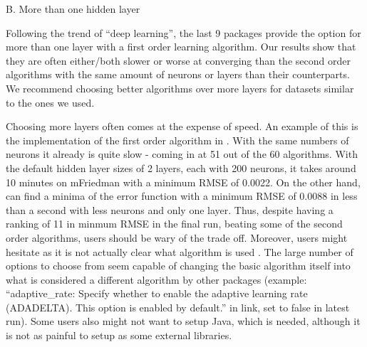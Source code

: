 B. More than one hidden layer

Following the trend of ``deep learning'', the last 9 packages provide
the option for more than one layer with a first order learning
algorithm. Our results show that they are often either/both slower or
worse at converging than the second order algorithms with the same
amount of neurons or layers than their counterparts. We recommend
choosing better algorithms over more layers for datasets similar to the
ones we used.

Choosing more layers often comes at the expense of speed. An example of
this is the implementation of the first order algorithm in 
\citep{R-h2o}. With the same numbers of neurons it already is quite slow
- coming in at 51 out of the 60 algorithms. With the default hidden
layer sizes of 2 layers, each with 200 neurons, it takes around 10
minutes on mFriedman with a minimum RMSE of 0.0022. On the other hand,
 can find a minima of the error function with a minimum
RMSE of 0.0088 in less than a second with less neurons and only one
layer. Thus, despite having a ranking of 11 in minmum RMSE in the final
run, beating some of the second order algorithms, users should be wary
of the trade off. Moreover, users might hesitate as it is not actually
clear what algorithm is used . The large number of options to choose
from seem capable of changing the basic algorithm itself into what is
considered a different algorithm by other packages (example:
``adaptive\_rate: Specify whether to enable the adaptive learning rate
(ADADELTA). This option is enabled by default.'' in link, set to false
in latest run). Some users also might not want to setup Java, which is
needed, although it is not as painful to setup as some external
libraries.

